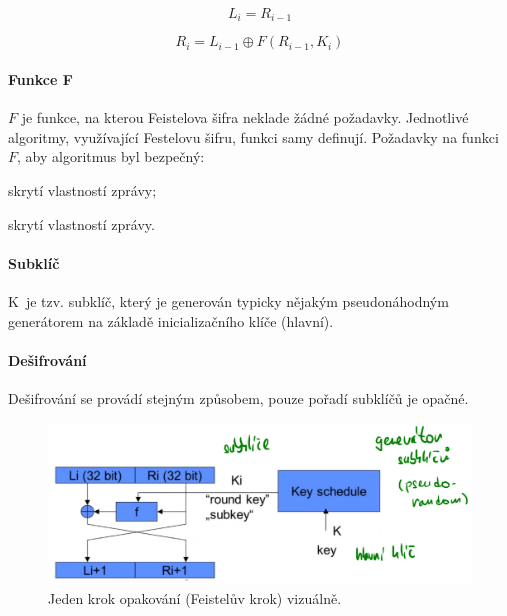 \begin{equation}
    L_i = R_{i-1}
\end{equation}

\begin{equation}
    R_i = L_{i-1} \oplus F(R_{i-1}, K_i)
\end{equation}

\paragraph*{Funkce F} $F$ je funkce, na kterou Feistelova šifra neklade žádné požadavky. Jednotlivé algoritmy, využívající Festelovu šifru, funkci samy definují. Požadavky na funkci $F$, aby algoritmus byl bezpečný: \begin{compactitem}
    \item skrytí vlastností zprávy;
    \item skrytí vlastností zprávy.
\end{compactitem}

\paragraph*{Subklíč} K~je tzv. subklíč, který je generován typicky nějakým pseudonáhodným generátorem na základě inicializačního klíče (hlavní).

\paragraph*{Dešifrování} Dešifrování se provádí stejným způsobem, pouze pořadí subklíčů je opačné.

\begin{figure}[H]
    \centering
    \includegraphics[width=1\linewidth]{feistel.png}
    \caption{Jeden krok opakování (Feistelův krok) vizuálně.}
\end{figure}

